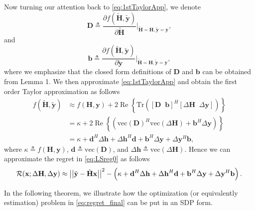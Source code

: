 \documentclass[review,sort&compress]{elsarticle}
\renewcommand{\vec}[1]{\mbox{$\mathbf{#1}$}}
\newcommand{\norm}[1]{\left|\left|#1\right|\right|}
\newcommand{\defi}{\triangleq}
\newcommand{\col}{\mathrm{vec}}
\newcommand{\nn}{\nonumber}
\newcommand{\R}{{\cal R}}
\newcommand{\vH}{\vec{H}}
\newcommand{\vx}{\vec{x}}
\newcommand{\vy}{\vec{y}}
\newcommand{\dH}{\Delta\vH}
\newcommand{\dy}{\Delta\vy}
\newcommand{\tH}{\tilde{\vec{H}}}
\newcommand{\ty}{\tilde{\vec{y}}}
\newcommand{\vD}{\vec{D}}
\newcommand{\vd}{\vec{d}}
\newcommand{\dvh}{\Delta\vec{h}}
\newcommand{\vb}{\vec{b}}
\begin{document}
Now turning our attention back to \eqref{eq:1stTaylorApp}, we denote
\[
\vD \defi \dfrac{\partial f\left(\tH, \ty \right)}{\partial \tH}\bigg\vert_{\tH=\vH, \ty=\vy},
\]
and
\[
\vb \defi \dfrac{\partial f\left(\tH, \ty \right)}{\partial \ty}\bigg\vert_{\tH=\vH, \ty=\vy},
\]
where we emphasize that the closed form definitions of $\vD$ and $\vb$ can be obtained from Lemma 1. We then approximate \eqref{eq:1stTaylorApp} and obtain the first order Taylor approximation as follows
\begin{align}\label{eq:thmReg}
  f\left(\tH, \ty \right) & \approx f(\vH, \vy) + 2\operatorname{Re}\left\{ \mathrm{Tr} \left( \left[\vD \;\; \vb \right]^H \left[\dH \;\; \dy \right] \right) \right\} \nn\\
              & = \kappa + 2\operatorname{Re}\left\{ \left(\col(\vD)^H \col(\dH) + \vb^H \dy \right) \right\} \nn\\
              & = \kappa + \vd^H \dvh + \dvh^H \vd + \vb^H \dy + \dy^H \vb,
\end{align}
where $\kappa \defi f(\vH,\vy)$, $\vd \defi \col(\vD)$, and $\dvh \defi \col(\dH)$. Hence we can approximate the regret in \eqref{eq:LSreg0} as follows
\begin{equation}\label{eq:regret_final}
  \R(\vx; \dH,\dy) \approx {\norm{\ty - \tH \vx}}^2 - \left( \kappa + \vd^H \dvh + \dvh^H \vd + \vb^H \dy + \dy^H \vb \right).
\end{equation}

In the following theorem, we illustrate how the optimization (or equivalently estimation) problem in \eqref{eq:regret_final} can be put in an SDP form.
\end{document}
